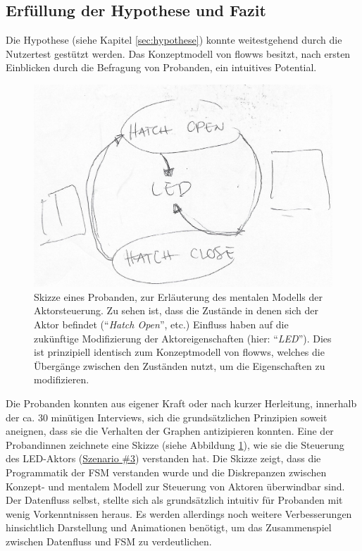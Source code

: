\subsection{Erfüllung der Hypothese und Fazit}
Die Hypothese (siehe Kapitel \ref{sec:hypothese}) konnte weitestgehend durch die Nutzertest gestützt werden. Das Konzeptmodell von flowws besitzt, nach ersten Einblicken durch die Befragung von Probanden, ein intuitives Potential.

\begin{figure}[h]
    \centering
    \includegraphics[width=.7\textwidth]{bilder/chapter5/joanna.jpg}
    \caption{Skizze eines Probanden, zur Erläuterung des mentalen Modells der Aktorsteuerung. Zu sehen ist, dass die Zustände in denen sich der Aktor befindet ("`\textit{Hatch Open}"', etc.) Einfluss haben auf die zukünftige Modifizierung der Aktoreigenschaften (hier: "`\textit{LED}"').  Dies ist prinzipiell identisch zum Konzeptmodell von flowws, welches die Übergänge zwischen den Zuständen nutzt, um die Eigenschaften zu modifizieren.}
    \label{fig:enduserskizze}
\end{figure}

Die Probanden konnten aus eigener Kraft oder nach kurzer Herleitung, innerhalb der ca. 30 minütigen Interviews, sich die grundsätzlichen Prinzipien soweit aneignen, dass sie die Verhalten der Graphen antizipieren konnten. Eine der Probandinnen zeichnete eine Skizze (siehe Abbildung \ref{fig:enduserskizze}), wie sie die Steuerung des LED-Aktors (\hyperref[szenario2]{Szenario \#3}) verstanden hat. Die Skizze zeigt, dass die Programmatik der \ac{FSM} verstanden wurde und die Diskrepanzen zwischen Konzept- und mentalem Modell zur Steuerung von Aktoren überwindbar sind. Der Datenfluss selbst, stellte sich als grundsätzlich intuitiv für Probanden mit wenig Vorkenntnissen heraus. Es werden allerdings noch weitere Verbesserungen hinsichtlich Darstellung und Animationen benötigt, um das Zusammenspiel zwischen Datenfluss und \ac{FSM} zu verdeutlichen.

